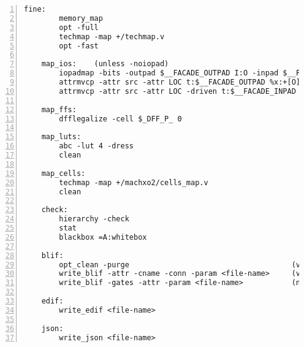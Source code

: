 \begin{lstlisting}[numbers=left,frame=single]
    fine:
        memory_map
        opt -full
        techmap -map +/techmap.v
        opt -fast

    map_ios:    (unless -noiopad)
        iopadmap -bits -outpad $__FACADE_OUTPAD I:O -inpad $__FACADE_INPAD O:I -toutpad $__FACADE_TOUTPAD ~T:I:O -tinoutpad $__FACADE_TINOUTPAD ~T:O:I:B A:top
        attrmvcp -attr src -attr LOC t:$__FACADE_OUTPAD %x:+[O] t:$__FACADE_TOUTPAD %x:+[O] t:$__FACADE_TINOUTPAD %x:+[B]
        attrmvcp -attr src -attr LOC -driven t:$__FACADE_INPAD %x:+[I]

    map_ffs:
        dfflegalize -cell $_DFF_P_ 0

    map_luts:
        abc -lut 4 -dress
        clean

    map_cells:
        techmap -map +/machxo2/cells_map.v
        clean

    check:
        hierarchy -check
        stat
        blackbox =A:whitebox

    blif:
        opt_clean -purge                                     (vpr mode)
        write_blif -attr -cname -conn -param <file-name>     (vpr mode)
        write_blif -gates -attr -param <file-name>           (non-vpr mode)

    edif:
        write_edif <file-name>

    json:
        write_json <file-name>
\end{lstlisting}

